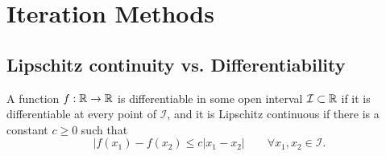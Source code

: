 \chapter{Iteration Methods}


\section{Lipschitz continuity vs. Differentiability}
A function \(f:\mathbb{R}\to\mathbb{R}\) is differentiable in some open interval \(\mathcal{I}\subset\mathbb{R}\) if it is differentiable at every point of \(\mathcal{I}\), and it is Lipschitz continuous if there is a constant \(c\geq0\) such that
\[ |f(x_1)-f(x_2)\leq c|x_1-x_2| \qquad \forall x_1,x_2\in\mathcal{I}. \]
